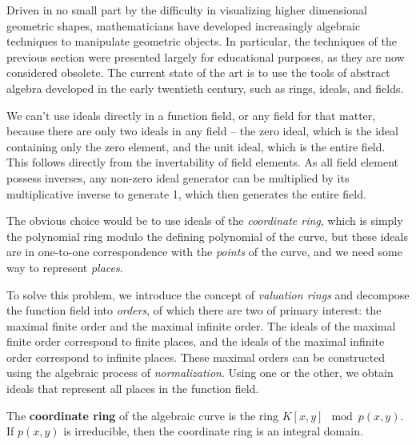 \vfill\eject
{}

Driven in no small part by the difficulty in visualizing higher dimensional geometric shapes,
mathematicians have developed increasingly algebraic techniques to manipulate geometric objects.
In particular, the techniques of the previous section were presented largely for educational purposes,
as they are now considered obsolete.
The current state of the art is to use the tools of abstract algebra developed in the early
twentieth century, such as rings, ideals, and fields.

We can't use ideals directly in a function field, or any field for that matter, because
there are only two ideals in any field -- the zero ideal, which is the ideal containing
only the zero element, and the unit ideal, which is the entire field.  This
follows directly from the invertability of field elements.  As all field element possess
inverses, any non-zero ideal generator can be multiplied by its multiplicative inverse
to generate 1, which then generates the entire field.

The obvious choice would be to use ideals of the {\it coordinate ring}, which is simply
the polynomial ring modulo the defining polynomial of the curve, but these ideals
are in one-to-one correspondence with the {\it points} of the curve, and we need
some way to represent {\it places}.

To solve this problem, we introduce the concept of {\it valuation rings}
and decompose the function field into {\it orders}, of which
there are two of primary interest: the maximal finite order and the maximal infinite order.
The ideals of the maximal finite order correspond to
finite places, and the ideals of the maximal infinite order correspond to infinite places.
These maximal orders can be constructed
using the algebraic process of {\it normalization}.
Using one or the other, we obtain ideals that represent all places in the function field.

\begin{definition}
The {\bf coordinate ring} of the algebraic curve is the ring $K[x,y] \mod p(x,y)$.
If $p(x,y)$ is irreducible, then the coordinate
ring is an integral domain.
\end{definition}


